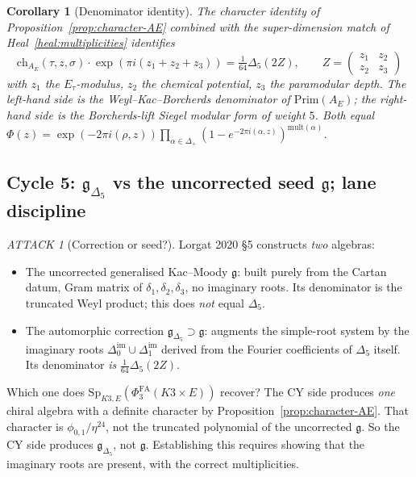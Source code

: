 \documentclass[11pt]{amsart}
\providecommand{\fg}{\mathfrak{g}}
\providecommand{\gDelta}{\mathfrak{g}_{\Delta_5}}
\providecommand{\Sp}{\mathrm{Sp}}
\providecommand{\Prim}{\mathrm{Prim}}
\providecommand{\mult}{\mathrm{mult}}
\theoremstyle{plain}
\newtheorem{corollary}[theorem]{Corollary}
\theoremstyle{definition}
\theoremstyle{remark}
\newtheorem*{attack}{ATTACK}
\begin{document}
\begin{corollary}[Denominator identity]
\label{cor:denominator}
The character identity of Proposition~\ref{prop:character-AE} combined
with the super-dimension match of Heal~\ref{heal:multiplicities}
identifies
\[
\mathrm{ch}_{A_E}(\tau,z,\sigma) \cdot\exp(\pi i(z_1+z_2+z_3))
= \tfrac{1}{64}\Delta_5(2Z),
\qquad Z=\begin{pmatrix}z_1 & z_2\\ z_2 & z_3\end{pmatrix}
\]
with $z_1$ the $E_\tau$-modulus, $z_2$ the chemical potential, $z_3$
the paramodular depth. The left-hand side is the Weyl--Kac--Borcherds
denominator of $\Prim(A_E)$; the right-hand side is the Borcherds-lift
Siegel modular form of weight $5$. Both equal
$\Phi(z)=\exp(-2\pi i(\rho,z))\prod_{\alpha\in\Delta_+}(1-e^{-2\pi
i(\alpha,z)})^{\mult(\alpha)}$.
\end{corollary}

\subsection{Cycle 5: $\gDelta$ vs the uncorrected seed $\fg$; lane discipline}
\label{sec:scope-heal}

\begin{attack}[Correction or seed?]
Lorgat 2020 \S5 constructs \emph{two} algebras:
\begin{itemize}[leftmargin=1.5em]
\item The uncorrected generalised Kac--Moody $\fg$: built purely from
the Cartan datum, Gram matrix of $\delta_1,\delta_2,\delta_3$, no
imaginary roots. Its denominator is the truncated Weyl product;
this does \emph{not} equal $\Delta_5$.
\item The automorphic correction $\gDelta\supset\fg$: augments the
simple-root system by the imaginary roots $\Delta^{\mathrm{im}}_0\cup
\Delta^{\mathrm{im}}_1$ derived from the Fourier coefficients of
$\Delta_5$ itself. Its denominator \emph{is} $\tfrac{1}{64}\Delta_5(2Z)$.
\end{itemize}
Which one does $\Sp_{K3,E}(\Phi^{\mathrm{FA}}_3(K3\times E))$ recover?
The CY side produces \emph{one} chiral algebra with a definite character
by Proposition~\ref{prop:character-AE}. That character is $\phi_{0,1}/
\eta^{24}$, not the truncated polynomial of the uncorrected $\fg$. So
the CY side produces $\gDelta$, not $\fg$. Establishing this requires
showing that the imaginary roots are present, with the correct
multiplicities.
\end{attack}
\end{document}

